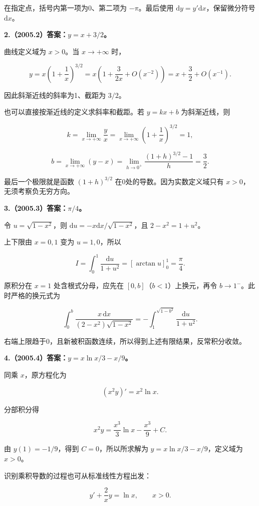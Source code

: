 \documentclass[UTF8,11pt,fontset=windows]{ctexart}
\begin{document}
在指定点，括号内第一项为0、第二项为 $-\pi$。最后使用 $\mathrm dy=y'\mathrm dx$，保留微分符号 $\mathrm dx$。

\clearpage

\textbf{2.（2005.2）答案：$y=x+3/2$。}

曲线定义域为 $x>0$。当 $x\to+\infty$ 时，

$$
y=x\left(1+\frac1x\right)^{3/2}
=x\left(1+\frac{3}{2x}+O(x^{-2})\right)
=x+\frac32+O(x^{-1}).
$$

因此斜渐近线的斜率为1、截距为 $3/2$。

也可以直接按渐近线的定义求斜率和截距。若 $y=kx+b$ 为斜渐近线，则

$$
k=\lim_{x\to+\infty}\frac{y}{x}
=\lim_{x\to+\infty}\left(1+\frac1x\right)^{3/2}=1,
$$

$$
b=\lim_{x\to+\infty}(y-x)
=\lim_{h\to0^+}\frac{(1+h)^{3/2}-1}{h}=\frac32.
$$

最后一个极限就是函数 $(1+h)^{3/2}$ 在0处的导数。因为实数定义域只有 $x>0$，无须考察负无穷方向。

\clearpage

\textbf{3.（2005.3）答案：$\pi/4$。}

令 $u=\sqrt{1-x^2}$，则 $\mathrm du=-x\mathrm dx/\sqrt{1-x^2}$，且 $2-x^2=1+u^2$。

上下限由 $x=0,1$ 变为 $u=1,0$，所以

$$
I=\int_0^1\frac{\mathrm du}{1+u^2}
=[\arctan u]_0^1=\frac\pi4.
$$

原积分在 $x=1$ 处含根式分母，应先在 $[0,b]$（$b<1$）上换元，再令 $b\to1^-$。此时严格的换元式为

$$
\int_0^b\frac{x\,\mathrm dx}{(2-x^2)\sqrt{1-x^2}}
=-\int_1^{\sqrt{1-b^2}}\frac{\mathrm du}{1+u^2}.
$$

右端上限趋于0，且新被积函数连续，所以得到上述有限结果，反常积分收敛。

\clearpage

\textbf{4.（2005.4）答案：$y=x\ln x/3-x/9$。}

同乘 $x$，原方程化为

$$
(x^2y)'=x^2\ln x.
$$

分部积分得

$$
x^2y=\frac{x^3}{3}\ln x-\frac{x^3}{9}+C.
$$

由 $y(1)=-1/9$，得到 $C=0$，所以所求解为 $y=x\ln x/3-x/9$，定义域为 $x>0$。

识别乘积导数的过程也可从标准线性方程出发：

$$
y'+\frac2x y=\ln x,\qquad x>0.
$$
\end{document}
